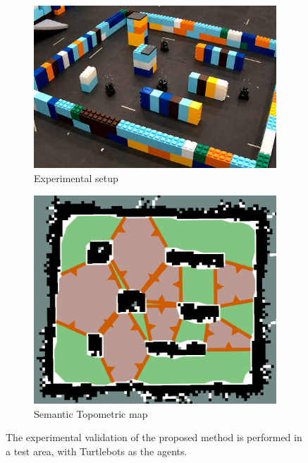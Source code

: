 \documentclass[letterpaper, 10 pt, conference]{ieeeconf}  %
\begin{document}
\begin{figure}[t]
    \centering
    \begin{subfigure}[t]{.45\linewidth}
         \centering
         \includegraphics[width=\linewidth]{experiment/setup.png}
         \caption{Experimental setup}
         \label{fig:exSetup}
    \end{subfigure}
    \begin{subfigure}[t]{.35\linewidth}
         \centering
         \includegraphics[width=\linewidth]{experiment/map.png}
         \caption{Semantic Topometric map}
         \label{fig:exMap}
    \end{subfigure}
    \caption{The experimental validation of the proposed method is performed in a test area, with Turtlebots as the agents.}
    \label{fig:expriment}
\end{figure}
\end{document}
